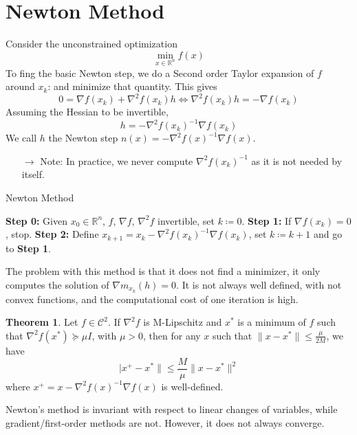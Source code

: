 \documentclass[12pt, openany]{report}
\newcommand{\R}{\mathbb{R}}
\theoremstyle{definition}
\newtheorem{thm}{Theorem}[chapter]
\begin{document}
\section{Newton Method}
Consider the unconstrained optimization 
\begin{equation}
    \min_{x\in \R^n} f(x)
\end{equation}
To fing the basic Newton step, we do a Second order Taylor expansion of \(f\) around \(x_k\): and minimize that quantity. This gives 
\begin{equation}
    0 = \nabla f(x_k) + \nabla^2f(x_k)h \Longleftrightarrow \nabla^2f(x_k)h = -\nabla f(x_k)
\end{equation}
Assuming the Hessian to be invertible, 
\begin{equation}
    h = -\nabla^2f(x_k)^{-1}\nabla f(x_k)
\end{equation}
We call $h$ the Newton step $n(x) = -\nabla^2f(x)^{-1}\nabla f(x)$. 
\begin{itemize}
    \item [\(\rightarrow\)] Note: In practice, we never compute $\nabla^2f(x_k)^{-1}$ as it is not needed by itself.
\end{itemize}
\begin{algorithm}
    \caption{Newton Method}\label{algo:newton}
    \begin{algorithmic}[1]
        \State \textbf{Step 0:} Given $x_0\in \R^n$, $f$, $\nabla f$, $\nabla^2f$ invertible, set $k\coloneqq 0$.
        \State \textbf{Step 1:} If $\nabla f(x_k)=0$, stop.
        \State \textbf{Step 2:} Define $x_{k+1}=x_k - \nabla^2f(x_k)^{-1}\nabla f(x_k)$, set $k\coloneqq k+1$ and go to \textbf{Step 1}.
    \end{algorithmic}
\end{algorithm}
The problem with this method is that it does not find a minimizer, it only computes the solution of $\nabla m_{x_k}(h)=0$. It is not always well defined, with not convex functions, and the computational cost of one iteration is high. 
\begin{thm}
    Let $f\in \mathcal{C}^2$. If $\nabla^2f$ is M-Lipschitz and $x^*$ is a minimum of $f$ such that $\nabla^2f(x^*)\succeq \mu I$, with $\mu>0$, then for any $x$ such that $\lVert x-x^*\rVert\le \frac{\mu}{2M}$, we have
    \begin{equation}
        \lvert x^+-x^*\rVert \le \frac{M}{\mu}\lVert x-x^*\rVert^2
    \end{equation}
    where $x^+ = x - \nabla^2f(x)^{-1}\nabla f(x)$ is well-defined.
\end{thm}
Newton's method is invariant with respect to linear changes of variables, while gradient/first-order methods are not. However, it does not always converge. 
\end{document}
